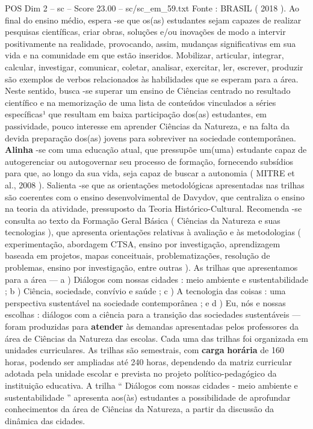 \begin{textsample}{POS Dim 2 – sc – Score 23.00 – sc/sc\_em\_59.txt}
Fonte : BRASIL ( 2018 ).
Ao final do ensino médio, espera -se que os(as) estudantes sejam capazes de realizar pesquisas científicas, criar obras, soluções e/ou inovações de modo a intervir positivamente na realidade, provocando, assim, mudanças significativas em sua vida e na comunidade em que estão inseridos.
Mobilizar, articular, integrar, calcular, investigar, comunicar, coletar, analisar, exercitar, ler, escrever, produzir são exemplos de verbos relacionados às habilidades que se esperam para a área.
Neste sentido, busca -se superar um ensino de Ciências centrado no resultado científico e na memorização de uma lista de conteúdos vinculados a séries específicas¹ que resultam em baixa participação dos(as) estudantes, em passividade, pouco interesse em aprender Ciências da Natureza, e na falta da devida preparação dos(as) jovens para sobreviver na sociedade contemporânea. \textbf{Alinha} -se com uma educação atual, que pressupõe um(uma) estudante capaz de autogerenciar ou autogovernar seu processo de formação, fornecendo subsídios para que, ao longo da sua vida, seja capaz de buscar a autonomia ( MITRE et al., 2008 ).
Salienta -se que as orientações metodológicas apresentadas nas trilhas são coerentes com o ensino desenvolvimental de Davydov, que centraliza o ensino na teoria da atividade, pressuposto da Teoria Histórico-Cultural.
Recomenda -se consulta ao texto da Formação Geral Básica ( Ciências da Natureza e suas tecnologias ), que apresenta orientações relativas à avaliação e às metodologias ( experimentação, abordagem CTSA, ensino por investigação, aprendizagem baseada em projetos, mapas conceituais, problematizações, resolução de problemas, ensino por investigação, entre outras ).
As trilhas que apresentamos para a área — a ) Diálogos com nossas cidades : meio ambiente e sustentabilidade ; b ) Ciência, sociedade, convívio e saúde ; c ) A tecnologia das coisas : uma perspectiva sustentável na sociedade contemporânea ; e d ) Eu, nós e nossas escolhas : diálogos com a ciência para a transição das sociedades sustentáveis — foram produzidas para \textbf{atender} às demandas apresentadas pelos professores da área de Ciências da Natureza das escolas.
Cada uma das trilhas foi organizada em unidades curriculares.
As trilhas são semestrais, com \textbf{carga} \textbf{horária} de 160 horas, podendo ser ampliadas até 240 horas, dependendo da matriz curricular adotada pela unidade escolar e prevista no projeto político-pedagógico da instituição educativa.
A trilha “ Diálogos com nossas cidades - meio ambiente e sustentabilidade ” apresenta aos(às) estudantes a possibilidade de aprofundar conhecimentos da área de Ciências da Natureza, a partir da discussão da dinâmica das cidades.

\end{textsample}
